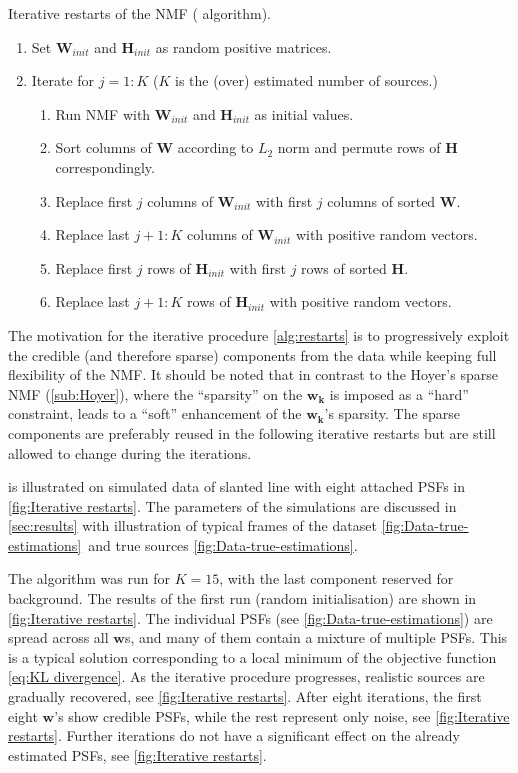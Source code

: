 \begin{algorithm}[hbt]
	\caption{Iterative restarts of the NMF (\inmf{} algorithm).}	
	\label{alg:restarts}
	\begin{enumerate}
		\item Set $\bm{W}_{init}$ and $\bm{H}_{init}$ as random positive matrices.
		\item Iterate for $j=1:K$ ($K$ is the (over) estimated number of sources.)
		\begin{enumerate}
			\item Run NMF with $\bm{W}_{init}$ and $\bm{H}_{init}$ as initial values.
			\item Sort columns of $\bm{W}$ according to $L_2$ norm and permute rows of $\bm{H}$ correspondingly.
			\item Replace first $j$ columns of $\bm{W}_{init}$ with first $j$ columns of sorted $\bm{W}$.
			\item Replace last $j+1:K$ columns of $\bm{W}_{init}$ with positive random vectors.
			\item Replace first $j$ rows of $\bm{H}_{init}$ with first $j$ rows of sorted $\bm{H}$.
			\item Replace last $j+1:K$ rows of $\bm{H}_{init}$ with positive random vectors.
		\end{enumerate}
	\end{enumerate}    
\end{algorithm}

The motivation for the iterative procedure \autoref{alg:restarts} is to progressively exploit the credible (and therefore sparse) components from the data while keeping full flexibility of the NMF. It should be noted that in contrast to the Hoyer's sparse NMF (\autoref{sub:Hoyer}), where the ``sparsity'' on the $\bm{w_k}$ is imposed as a ``hard'' constraint, \inmf{} leads to a ``soft'' enhancement of the $\bm{w_k}$'s sparsity. The sparse components are preferably reused in the following iterative restarts but are still allowed to change during the iterations. 

\inmf{} is illustrated on simulated data of slanted line with eight attached PSFs in \autoref{fig:Iterative restarts}. The parameters of the simulations are discussed in  \autoref{sec:results} with illustration of typical frames of the dataset \autoref{fig:Data-true-estimations}\aaa\ and true sources \autoref{fig:Data-true-estimations}\bbb.

The algorithm was run for $K=15$, with the last component reserved for background. The results of the first run (random initialisation) are shown in \autoref{fig:Iterative restarts}\aaa. The individual PSFs (see \autoref{fig:Data-true-estimations}\bbb) are spread across all $\bm{w}$s, and many of them contain a mixture of multiple PSFs. This is a typical solution corresponding to a local minimum of the objective function \autoref{eq:KL divergence}. As the iterative procedure progresses, realistic sources are gradually recovered, see \autoref{fig:Iterative restarts}\bbb. After eight iterations, the first eight $\bm{w}$'s show credible PSFs, while the rest represent only noise, see \autoref{fig:Iterative restarts}\ccc. Further iterations do not have a significant effect on the already estimated PSFs, see \autoref{fig:Iterative restarts}\ddd. 

